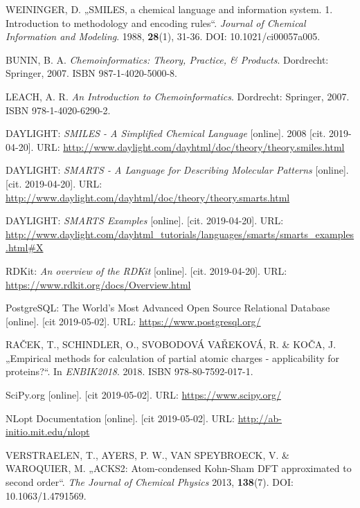 \begin{thebibliography}{10}
WEININGER, D. „SMILES, a chemical language and information system. 1. Introduction to methodology and encoding rules“. \textit{Journal of Chemical Information and Modeling}. 1988, \textbf{28}(1), 31-36. DOI: 10.1021/ci00057a005.

BUNIN, B. A. \textit{Chemoinformatics: Theory, Practice, \& Products}. Dordrecht: Springer, 2007. ISBN 987-1-4020-5000-8.

LEACH, A. R. \textit{An Introduction to Chemoinformatics}. Dordrecht: Springer, 2007. ISBN 978-1-4020-6290-2.

DAYLIGHT: \textit{SMILES - A Simplified Chemical Language} [online]. 2008 [cit. 2019-04-20]. URL: \url{ http://www.daylight.com/dayhtml/doc/theory/theory.smiles.html}

DAYLIGHT: \textit{SMARTS - A Language for Describing Molecular Patterns} [online]. [cit. 2019-04-20]. URL: \url{ http://www.daylight.com/dayhtml/doc/theory/theory.smarts.html}

DAYLIGHT: \textit{SMARTS Examples} [online]. [cit. 2019-04-20]. URL: \url{ http://www.daylight.com/dayhtml_tutorials/languages/smarts/smarts_examples.html#X}

RDKit: \textit{An overview of the RDKit} [online]. [cit. 2019-04-20]. URL: \url{ https://www.rdkit.org/docs/Overview.html}

PostgreSQL: The World's Most Advanced Open Source Relational Database [online]. [cit 2019-05-02]. URL: \url{https://www.postgresql.org/}

RAČEK, T., SCHINDLER, O., SVOBODOVÁ VAŘEKOVÁ, R. \& KOČA, J. „Empirical methods for calculation of partial atomic charges - applicability for proteins?“. In \textit{ENBIK2018}. 2018. ISBN 978-80-7592-017-1.

SciPy.org [online]. [cit 2019-05-02]. URL: \url{https://www.scipy.org/}

NLopt Documentation [online]. [cit 2019-05-02].
URL: \url{http://ab-initio.mit.edu/nlopt}

VERSTRAELEN, T., AYERS, P. W., VAN SPEYBROECK, V. \& WAROQUIER, M. „ACKS2: Atom-condensed Kohn-Sham DFT approximated to second order“. \textit{The Journal of Chemical Physics} 2013, \textbf{138}(7). DOI: 10.1063/1.4791569.


\end{thebibliography}
